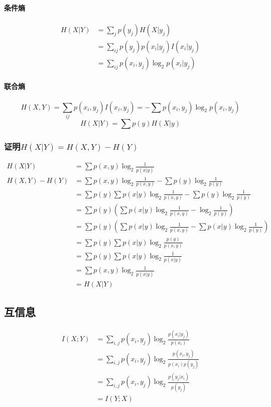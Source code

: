 \documentclass[a4paper, 12pt]{article}
\begin{document}
    \paragraph{条件熵} 
    \begin{align}
        H(X|Y)&=\sum_jp(y_j)H(X|y_j)\\
        &=\sum_{ij}p(y_j)p(x_i|y_j)I(x_i|y_j)\\
        &=\sum_{ij}p(x_i,y_j)\log_2p(x_i|y_j)
    \end{align}
    \paragraph{联合熵}
    \[H(X,Y)=\sum_{ij}p(x_i,y_j)I(x_i,y_j)=-\sum p(x_i,y_j)\log_2p(x_i,y_j)\]
    \[H(X|Y)=\sum p(y)H(X|y)\]
    \subsubsection{证明$H(X|Y)=H(X,Y)-H(Y)$}
    \begin{align}
        H(X|Y)&=\sum p(x,y)\log_2\frac{1}{p(x|y)}\\
        H(X,Y)-H(Y)&=\sum p(x,y)\log_2\frac{1}{p(x,y)}-\sum p(y)\log_2\frac{1}{p(y)}\\
        &=\sum p(y)\sum p(x|y)\log_2\frac{1}{p(x,y)}-\sum p(y)\log_2\frac{1}{p(y)}\\
        &=\sum p(y)(\sum p(x|y)\log_2\frac{1}{p(x,y)}-\log_2\frac{1}{p(y)})\\
        &=\sum p(y)(\sum p(x|y)\log_2\frac{1}{p(x,y)}-\sum p(x|y)\log_2\frac{1}{p(y)})\\
        &=\sum p(y)\sum p(x|y)\log_2\frac{p(y)}{p(x,y)}\\
        &=\sum p(y)\sum p(x|y)\log_2\frac{1}{p(x|y)}\\
        &=\sum p(x,y)\log_2\frac{1}{p(x|y)}\\
        &=H(X|Y)
    \end{align}
    \subsection{互信息}
    \begin{align}
        I(X;Y)&=\sum_{i,j}p(x_i,y_j)\log_2\frac{p(x_i|y_j)}{p(x_i)}\\
        &=\sum_{i,j}p(x_i,y_j)\log_2\frac{p(x_i,y_j)}{p(x_i)p(y_j)}\\
        &=\sum_{i,j}p(x_i,y_j)\log_2\frac{p(y_j|x_i)}{p(y_j)}\\
        &=I(Y;X)
    \end{align}
\end{document}
